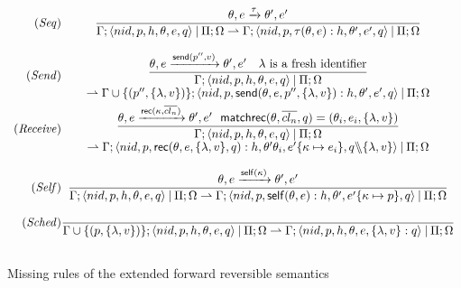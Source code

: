 \documentclass[runningheads]{llncs}
\newcommand{\sslash}{\mathbin{\mkern-4mu \backslash \mkern-6mu \backslash \mkern-4mu}}
\newcommand{\arro}[1]{\xrightarrow{#1}}
\newcommand{\comp}{\:|\:}
\newcommand{\rfpair}[2]{(#1,#2)}
\newcommand{\set}[1]{\{#1\}}
\newcommand{\ms}[1]{\mathsf{#1}}
\newcommand{\rh}{\rightharpoonup}
\def \tuple#1{\langle #1 \rangle}
\begin{document}
\begin{figure}
\small
\hspace{-1.25cm}
  $
   \begin{array}{r@{}c}
  	
  (\mathit{Seq}) & {\displaystyle
  \frac{\theta,e \arro{\tau}\theta',e'}{\Gamma; \tuple{nid, p, h, \theta,e, q} \comp \Pi; \Omega \rh \Gamma; \tuple{nid, p, \tau(\theta,e): h, \theta',e', q} \comp \Pi; \Omega}}\\[4ex]
  
  (\mathit{Send}) & 
  {\begin{array}{c} \displaystyle
  \frac{\theta,e \arro{\ms{send}(p'',v)}\theta',e'~~~\lambda~\text{is a fresh identifier}} 
  {\Gamma; \tuple{nid, p, h, \theta,e, q} \comp \Pi; \Omega}\\ \rh \Gamma\cup \{\rfpair{p''}{\{\lambda,v\}}\}; \tuple{nid, p, \ms{send}(\theta,e,p'',\{\lambda,v\}): h, \theta',e', q} \comp \Pi; \Omega  
  \end{array}}\\[4ex]
 
  (\mathit{Receive}) & 
  {\begin{array}{c} \displaystyle
  \frac{\theta,e \arro{\ms{rec}(\kappa,\overline{cl_n})}\theta',e'~~\ms{matchrec}(\theta,\overline{cl_n},q)=(\theta_i,e_i,\{\lambda,v\})} 
  {\Gamma; \tuple{nid, p, h, \theta,e, q} \comp \Pi; \Omega}\\ \rh \Gamma; \tuple{nid, p, \ms{rec}(\theta,e,\{\lambda,v\},q): h,\theta'\theta_i,e'\{\kappa \mapsto e_i\},q \sslash \set{\lambda,v}} \comp \Pi; \Omega
    \end{array}}\\[6ex]
     
	(\mathit{Self}) & \displaystyle
  	\frac{\theta,e \arro{\ms{self}(\kappa)}\theta',e'}
  	{\Gamma; \tuple{nid, p, h, \theta,e, q} \comp \Pi; \Omega \rh \Gamma; \tuple{nid, p, \ms{self}(\theta,e): h, \theta',e'\set{\kappa \mapsto p}, q} \comp \Pi; \Omega}\\[4ex]
    
    (\mathit{Sched}) & \displaystyle
  	\frac{}
  	{\Gamma\cup\set{\rfpair{p}{\set{\lambda,v}}}; \tuple{nid, p, h, \theta,e, q} \comp \Pi; \Omega \rh \Gamma; \tuple{nid, p,h, \theta,e, \set{\lambda,v}:q} \comp \Pi; \Omega}\\[4ex]
	\end{array}
  $
  \caption{Missing rules of the extended forward reversible semantics}
  \label{fig:ex-fwd-semantics2}
\end{figure}
\end{document}
